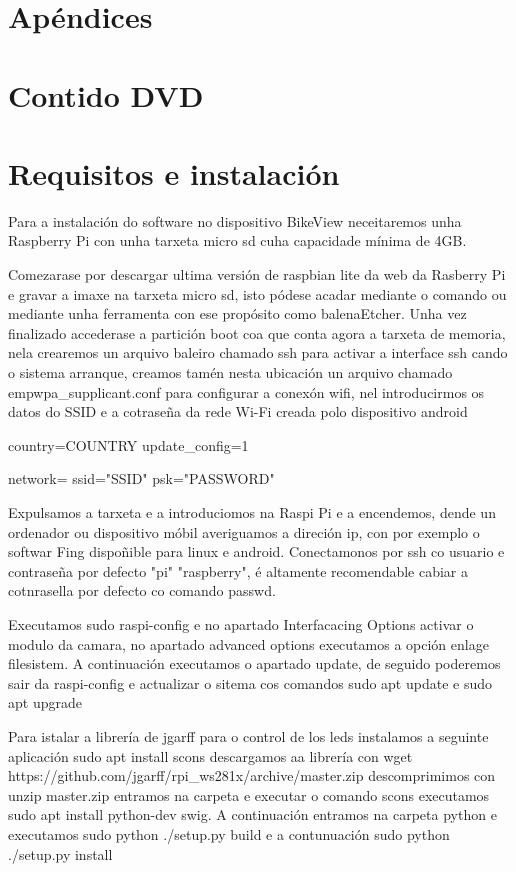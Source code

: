 \newpage
\chapter*{Apéndices}
\thispagestyle{empty}

\chapter{Contido DVD}

\chapter{Requisitos e instalación}
Para a instalación do software no dispositivo BikeView neceitaremos unha Raspberry Pi con unha tarxeta micro sd cuha capacidade mínima de 4GB.

Comezarase por descargar ultima versión de raspbian lite da web da Rasberry Pi e gravar a imaxe na tarxeta micro sd, isto pódese acadar mediante o comando  ou mediante unha ferramenta con ese propósito como balenaEtcher.
Unha vez finalizado accederase a partición boot coa que conta agora a tarxeta de memoria, nela crearemos un arquivo baleiro chamado ssh para activar a interface ssh cando o sistema arranque, creamos tamén nesta ubicación un arquivo chamado emp{wpa_supplicant.conf} para configurar a conexón wifi, nel introducirmos os datos do SSID e a cotraseña da rede Wi-Fi creada polo dispositivo android

	country=COUNTRY
	update_config=1

	network={
	       ssid="SSID"
	       psk="PASSWORD"
	    }

Expulsamos a tarxeta e a introduciomos na Raspi Pi e a encendemos, dende un ordenador ou dispositivo móbil averiguamos a direción ip, con por exemplo o softwar Fing dispoñible para linux e android. Conectamonos por ssh co usuario e contraseña por defecto "pi" "raspberry", é altamente recomendable cabiar a cotnrasella por defecto co comando passwd.

Executamos sudo raspi-config e no apartado Interfacacing Options activar o modulo da camara, no apartado advanced options executamos a opción enlage filesistem. A continuación executamos o apartado update, de seguido poderemos sair da raspi-config e actualizar o sitema cos comandos
sudo apt update e sudo apt upgrade

Para istalar a librería  de jgarff para o control de los leds instalamos a seguinte aplicación sudo apt install scons
descargamos aa librería con wget https://github.com/jgarff/rpi_ws281x/archive/master.zip
descomprimimos con unzip master.zip
entramos na carpeta e executar o comando scons
executamos sudo apt install python-dev swig. A continuación entramos na carpeta python e executamos sudo python ./setup.py build e a contunuación sudo python ./setup.py install

\newpage
\thispagestyle{empty}
